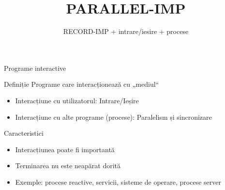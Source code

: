 \documentclass[xcolor=pdftex,romanian,colorlinks]{beamer}
\title[SLP---interactie]{PARALLEL-IMP}
\subtitle{RECORD-IMP + intrare/iesire + procese}
\begin{document}
\maketitle

\begin{frame}{Programe interactive}
\begin{block}{Definiție} Programe care interacționează cu „mediul“
\begin{itemize}
\item Interacțiune cu utilizatorul: Intrare/Ieșire
\item Interacțiune cu alte programe (procese): Paralelism și sincronizare
\end{itemize} 
\end{block}

\begin{block}{Caracteristici}
\begin{itemize}
\item Interacțiunea poate fi importantă  
\item Terminarea nu este neapărat dorită 
\item Exemple: procese reactive, servicii, sisteme de operare, procese server 
\end{itemize}
\end{block}
\end{frame}
\end{document}
